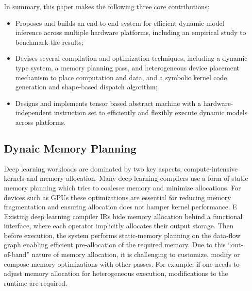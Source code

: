 In summary, this paper makes the following three core contributions:
\begin{itemize}
    \item Proposes and builds an end-to-end system for efficient dynamic model inference across multiple hardware platforms, including an empirical study to benchmark the results;
    \item Devises several compilation and optimization techniques,
    including a dynamic type system, a memory planning pass, and heterogeneous device placement mechanism to place computation and data, and a symbolic kernel code generation and shape-based dispatch algorithm;
    \item Designs and implements tensor based abstract machine with a hardware-independent instruction set to efficiently and flexibly execute dynamic models across platforms.
\end{itemize}

\subsection{Dynaic Memory Planning}
\label{sec:compliation:memory}
Deep learning workloads are dominated by two key aspects,
  compute-intensive kernels and memory allocation.
Many deep learning compilers use a form of static memory planning which tries to
  coalesce memory and minimize allocations.
For devices such as GPUs these optimizations are essential for reducing memory fragmentation and ensuring allocation
  does not hamper kernel performance. E
Existing deep learning compiler IRs hide memory allocation behind a functional interface,
  where each operator implicitly allocates their output storage.
Then before execution, the system performs static-memory planning on the data-flow graph enabling efficient pre-allocation of the required memory. Due to this ``out-of-band'' nature of memory allocation, it is challenging to customize, modify or compose memory optimizations with other passes. For example, if one needs to adjust memory allocation for heterogeneous execution, modifications to the runtime are required.

